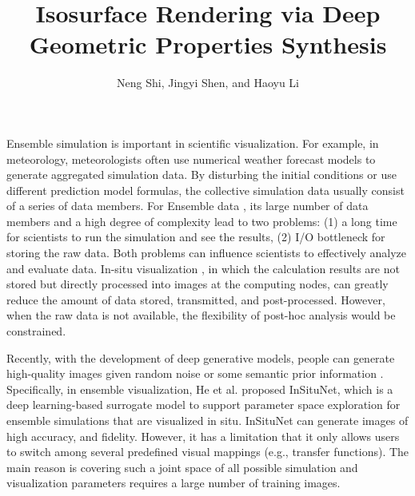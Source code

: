 \documentclass[journal]{vgtc}                %
\title{Isosurface Rendering via Deep Geometric Properties Synthesis}
\author{Neng Shi, Jingyi Shen, and Haoyu Li}
\begin{document}


\maketitle

Ensemble simulation \cite{wang2018visualization} is important in scientific visualization. For example, in meteorology, meteorologists often use numerical weather forecast models to generate aggregated simulation data. By disturbing the initial conditions or use different prediction model formulas, the collective simulation data usually consist of a series of data members. For Ensemble data \cite{ahrens2014situ, ahrens2014image}, its large number of data members and a high degree of complexity lead to two problems: (1) a long time for scientists to run the simulation and see the results, (2) I/O bottleneck for storing the raw data. Both problems can influence scientists to effectively analyze and evaluate data. In-situ visualization \cite{bauer2016situ, ma2009situ}, in which the calculation results are not stored but directly processed into images at the computing nodes, can greatly reduce the amount of data stored, transmitted, and post-processed. However, when the raw data is not available, the flexibility of post-hoc analysis would be constrained.  

Recently, with the development of deep generative models, people can generate high-quality images given random noise \cite{goodfellow2014generative} or some semantic prior information \cite{mirza2014conditional}. Specifically, in ensemble visualization, He et al. \cite{he2019insitunet} proposed InSituNet, which is a deep learning-based surrogate model to support parameter space exploration for ensemble simulations that are visualized in situ. InSituNet can generate images of high accuracy, and fidelity. However, it has a limitation that it only allows users to switch among several predefined visual mappings (e.g., transfer functions). The main reason is covering such a joint space of all possible simulation and visualization parameters requires a large number of training images.
\end{document}
